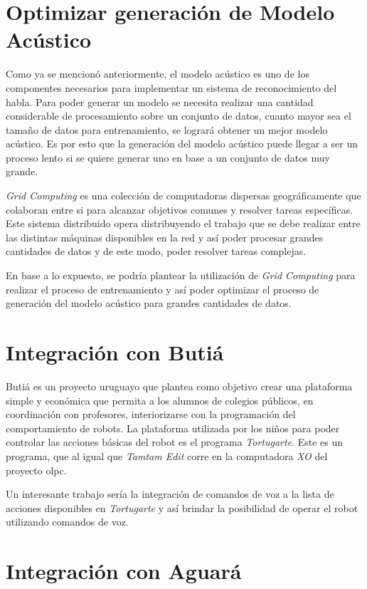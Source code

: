 \section{Optimizar generaci\'on de Modelo Ac\'ustico}

Como ya se mencion\'o anteriormente, el modelo ac\'ustico es uno de los componentes necesarios para implementar un sistema de 
reconocimiento del habla. Para poder generar un modelo se necesita realizar una cantidad considerable de procesamiento sobre
un conjunto de datos, cuanto mayor sea el tama\~no de datos para entrenamiento, se lograr\'a obtener un mejor modelo ac\'ustico. Es por
esto que la generaci\'on del modelo ac\'ustico puede llegar a ser un proceso lento si se quiere generar uno en base a un conjunto de datos
muy grande.

\emph{Grid Computing} es una colecci\'on de computadoras dispersas geogr\'aficamente que colaboran entre si para alcanzar objetivos comunes y resolver
tareas espec\'ificas. Este sistema distribuido opera distribuyendo el trabajo que se debe realizar entre las distintas m\'aquinas disponibles en la red
y as\'i poder procesar grandes cantidades de datos y de este modo, poder resolver tareas complejas.

En base a lo expuesto, se podr\'ia plantear la utilizaci\'on de \emph{Grid Computing} para realizar el proceso de entrenamiento y as\'i
poder optimizar el proceso de generaci\'on del modelo ac\'ustico para grandes cantidades de datos.

\section{Integraci\'on con Buti\'a}

Buti\'a es un proyecto uruguayo que plantea como objetivo crear una plataforma simple y econ\'omica que permita a los alumnos de colegios p\'ublicos,
en coordinaci\'on con profesores, interiorizarse con la programaci\'on del comportamiento de robots\cite{Butia}. La plataforma
utilizada por los ni\~nos para poder controlar las acciones b\'asicas del robot es el programa \emph{Tortugarte}. Este es un
programa, que al igual que \emph{Tamtam Edit} corre en la computadora \emph{XO} del proyecto \gls{olpc}.

Un interesante trabajo ser\'ia la integraci\'on de comandos de voz a la lista de acciones disponibles 
en \emph{Tortugarte} y as\'i brindar la posibilidad de operar el robot utilizando comandos de voz.

\section{Integraci\'on con Aguar\'a}

